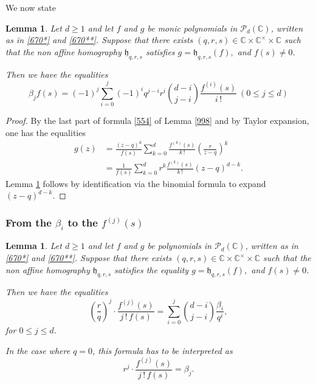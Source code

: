 \documentclass[10pt]{article}
\newtheorem{lemma}[theorem]{Lemma}
\theoremstyle{definition}
\numberwithin{equation}{section}
\newcommand {\C}{{\mathbb{C}}}
\begin{document}
We now state

 \begin{lemma}\label{hugesystem} Let $d \geqslant 1$ and let $f$ and $g$ be monic polynomials in $\mathcal P_d (\C)$, written as in \eqref{670*} and \eqref{670**}. 
Suppose that there exists $(q,r,s)\in \C \times \C^\times \times \C$ such that the non affine homography $\mathfrak h_{q,r,s}$ satisfies $ g = \mathfrak h_{q,r,s} (f), 
 $ and $f(s) \neq 0$.
 
 Then we have the equalities
 \begin{equation*}
\beta_j f(s)=(-1)^{j} \sum_{i=0}^j (-1)^i q^{j-i} r^i \binom{d-i}{j-i} \frac{f^{(i)}(s)}{i\, !} \ (0\leqslant j\leqslant d)
\end{equation*}
\end{lemma}
\begin{proof} By the last part of formula \eqref{554} of Lemma \ref{998} and by Taylor expansion, one has the equalities
 \begin{align*}
 g(z) & = \frac{(z-q)^d}{f(s)}\sum_{k=0}^d \frac{f^{(k)}(s)} {k\, !} \left(\frac {r}{z-q}\right)^k
 \\ 
 &= \frac{1}{f(s)}\sum_{k=0}^d r^k \frac{f^{(k)}(s)} {k\, !} (z-q)^{d-k}.
 \end{align*}
 Lemma \ref{hugesystem} follows by identification via the binomial formula to expand $(z-q)^{d-k}$.
\end{proof}

\subsubsection{From the $\beta_i$ to the $f^{(j)} (s)$} 
 
\begin{lemma} \label{872} Let $d \geqslant 1$ and let $f$ and $g$ be polynomials in $\mathcal P_d (\C)$, written as in \eqref{670*} and \eqref{670**}.
Suppose that there exists $(q,r,s)\in \C \times \C^\times \times \C$ such that the non affine homography $\mathfrak h_{q,r,s}$ satisfies the equality $ g = \mathfrak h_{q,r,s} (f), 
 $ and $f(s) \neq 0$. 

\noindent Then we have the equalities 
 \begin{equation}\label{expressionofderivatives}\left( \frac rq\right)^j \cdot \frac{f^{(j)}(s)}{j\, !\, f(s)}
=\sum_{i=0}^j \binom{d-i}{j-i} \frac{\beta_{i}}{q^i},
\end{equation}
for $0\leqslant j \leqslant d$.

In the case where $q=0$, this formula has to be interpreted as
\begin{equation}\label{whenq=0}
 r^j \cdot \frac{f^{(j)}(s)}{j\, !\, f(s)}
= \beta_j.
\end{equation}
\end{lemma}
\end{document}
